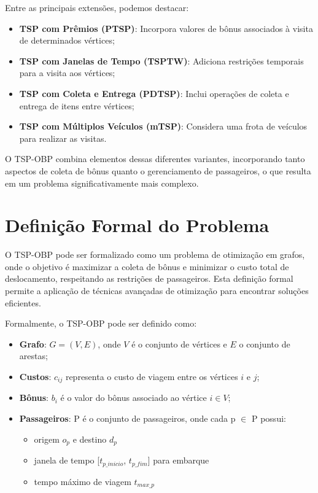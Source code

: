 \documentclass[12pt, a4paper]{report}
\begin{document}
Entre as principais extensões, podemos destacar:

\begin{itemize}
    \item \textbf{TSP com Prêmios (PTSP)}: Incorpora valores de bônus associados à visita de determinados vértices;
    \item \textbf{TSP com Janelas de Tempo (TSPTW)}: Adiciona restrições temporais para a visita aos vértices;
    \item \textbf{TSP com Coleta e Entrega (PDTSP)}: Inclui operações de coleta e entrega de itens entre vértices;
    \item \textbf{TSP com Múltiplos Veículos (mTSP)}: Considera uma frota de veículos para realizar as visitas.
\end{itemize}

O TSP-OBP combina elementos dessas diferentes variantes, incorporando tanto aspectos de coleta de bônus quanto o gerenciamento de passageiros, o que resulta em um problema significativamente mais complexo.

\section{Definição Formal do Problema}
O TSP-OBP pode ser formalizado como um problema de otimização em grafos, onde o objetivo é maximizar a coleta de bônus e minimizar o custo total de deslocamento, respeitando as restrições de passageiros. Esta definição formal permite a aplicação de técnicas avançadas de otimização para encontrar soluções eficientes.

Formalmente, o TSP-OBP pode ser definido como:

\begin{itemize}
    \item \textbf{Grafo}: $G = (V, E)$, onde $V$ é o conjunto de vértices e $E$ o conjunto de arestas;
    \item \textbf{Custos}: $c_{ij}$ representa o custo de viagem entre os vértices $i$ e $j$;
    \item \textbf{Bônus}: $b_i$ é o valor do bônus associado ao vértice $i \in V$;
    \item \textbf{Passageiros}: P é o conjunto de passageiros, onde cada p $\in$ P possui:
    \begin{itemize}
        \item origem $o_p$ e destino $d_p$
        \item janela de tempo [$t_{p\_inicio}$, $t_{p\_fim}$] para embarque
        \item tempo máximo de viagem $t_{max\_p}$
    \end{itemize}
\end{itemize}
\end{document}
